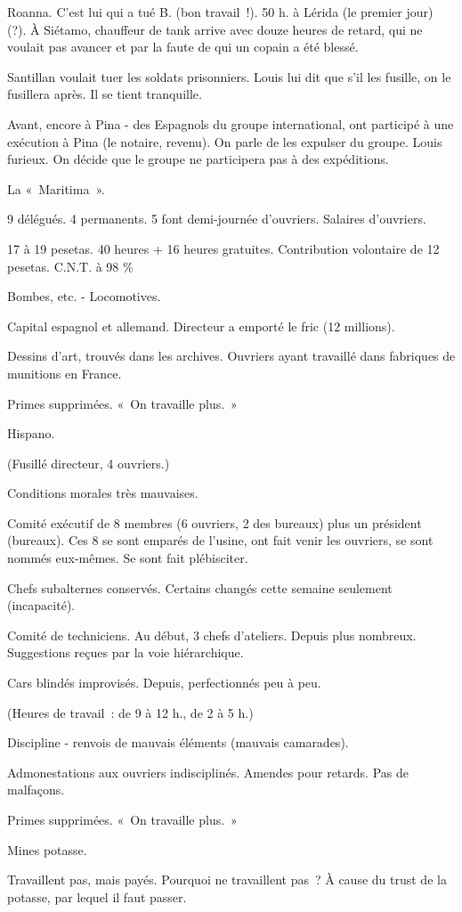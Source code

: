\documentclass[french,twoside]{book} %
\begin{document}
Roanna. C'est lui qui a tué B. (bon travail !). 50 h. à Lérida (le premier jour) (?). À Siétamo, chauffeur de tank arrive avec douze heures de retard, qui ne voulait pas avancer et par la faute de qui un copain a été blessé.\par
Santillan voulait tuer les soldats prisonniers. Louis lui dit que s'il les fusille, on le fusillera après. Il se tient tranquille.\par
Avant, encore à Pina - des Espagnols du groupe international, ont participé à une exécution à Pina (le notaire, revenu). On parle de les expulser du grou­pe. Louis furieux. On décide que le groupe ne participera pas à des expéditions.\par
La « Maritima ».\par
9 délégués. 4 permanents. 5 font demi-journée d'ouvriers. Salaires d'ouvriers.\par
17 à 19 pesetas. 40 heures + 16 heures gratuites. Contribution volontaire de 12 pesetas. C.N.T. à 98 \%\par
Bombes, etc. - Locomotives.\par
Capital espagnol et allemand. Directeur a emporté le fric (12 millions).\par
Dessins d'art, trouvés dans les archives. Ouvriers ayant travaillé dans fabriques de munitions en France.\par
Primes supprimées. « On travaille plus. »\par
Hispano.\par
(Fusillé directeur, 4 ouvriers.)\par
Conditions morales très mauvaises.\par
Comité exécutif de 8 membres (6 ouvriers, 2 des bureaux) plus un prési­dent (bureaux). Ces 8 se sont emparés de l'usine, ont fait venir les ouvriers, se sont nommés eux-mêmes. Se sont fait plébisciter.\par
Chefs subalternes conservés. Certains changés cette semaine seulement (incapacité).\par
Comité de techniciens. Au début, 3 chefs d'ateliers. Depuis plus nom­breux. Suggestions reçues par la voie hiérarchique.\par
Cars blindés improvisés. Depuis, perfectionnés peu à peu.\par
(Heures de travail : de 9 à 12 h., de 2 à 5 h.)\par
Discipline - renvois de mauvais éléments (mauvais camarades).\par
Admonestations aux ouvriers indisciplinés. Amendes pour retards. Pas de malfaçons.\par
Primes supprimées. « On travaille plus. »\par
Mines potasse.\par
\par
Travaillent pas, mais payés. Pourquoi ne travaillent pas ? À cause du trust de la potasse, par lequel il faut passer.\par
\end{document}
